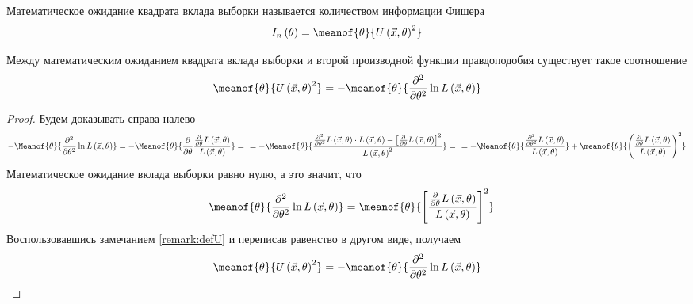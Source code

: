 \begin{definition}
  \label{def:fisherInformation}
  Математическое ожидание квадрата вклада выборки называется
  количеством информации Фишера
  $$I_n\left(\theta\right)=
    \meanof{\theta}{U\left( \vec{x},\theta \right)^2}$$
\end{definition}
\begin{remark}
  Между математическим ожиданием квадрата вклада выборки и второй производной
  функции правдоподобия существует такое соотношение
  \begin{equation*}
    \meanof{\theta}{U\left( \vec{x},\theta \right)^2}
    = - \meanof{\theta}{
      \frac{\partial^2}{\partial\theta^2}
      \ln{L\left( \vec{x},\theta \right)}}
  \end{equation*}
\end{remark}
\begin{proof}
  Будем доказывать справа налево
  \begin{align*}
  - \Meanof{\theta}{
    \frac{\partial^2}{\partial \theta^2}
    \ln{L\left( \vec{x}, \theta \right)}}
  = - \Meanof{\theta}{
    \frac{\partial}{\partial\theta}
    \frac{\frac{\partial}{\partial\theta}L\left(\vec{x},\theta\right)}
      {L\left(\vec{x},\theta\right)}} = \ \
  = -\Meanof{\theta}{
    \frac{\frac{\partial^2}{\partial\theta^2}
      L\left(\vec{x},\theta\right)\cdot L\left(\vec{x},\theta\right)-
        \left[\frac{\partial}{\partial\theta}
          L\left(\vec{x},\theta\right)\right]^2
      }
      {L\left(\vec{x},\theta\right)^2}} = \ \
  = - \Meanof{\theta}{
    \frac{\frac{\partial^2}{\partial\theta^2}
      L\left(\vec{x},\theta\right)}
      {L\left(\vec{x},\theta\right)}}
    + \meanof{\theta}{
      \left(\frac{\frac{\partial}{\partial\theta}
        L\left(\vec{x},\theta\right)}
        {L\left(\vec{x},\theta\right)}\right)^2}
  \end{align*}
  Математическое ожидание вклада выборки равно нулю, а это значит, что
  \begin{equation*}
   - \meanof{\theta}{\frac{\partial^2}{\partial\theta^2}
      \ln{L\left( \vec{x},\theta \right)}}
   = \meanof{\theta}{\left[\frac{\frac{\partial}{\partial\theta}
      L\left(\vec{x},\theta\right)}{L\left(\vec{x},\theta\right)}\right]^2}
  \end{equation*}
  Воспользовавшись замечанием \ref{remark:defU} и переписав равенство в другом
  виде, получаем
  \begin{equation*}
    \meanof{\theta}{U\left( \vec{x},\theta \right)^2}
    = - \meanof{\theta}{
      \frac{\partial^2}{\partial\theta^2}
      \ln{L\left( \vec{x},\theta \right)}}
  \end{equation*}
\end{proof}

